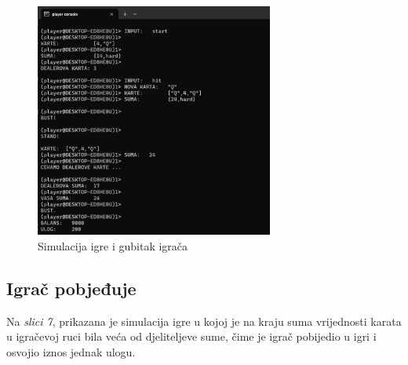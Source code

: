 \documentclass[conference]{IEEEtran}
\begin{document}
\begin{figure}[H]
\centerline{\includegraphics[width=18.5pc]{3.jpeg}}
\caption{Simulacija igre i gubitak igrača}
\vspace*{-5pt}
\end{figure}


\subsection{Igrač pobjeđuje}

Na \textit{slici 7}, prikazana je simulacija igre u kojoj je na kraju suma vrijednosti karata u igračevoj ruci bila veća od djeliteljeve sume, čime je igrač pobijedio u igri i osvojio iznos jednak ulogu.
\end{document}

